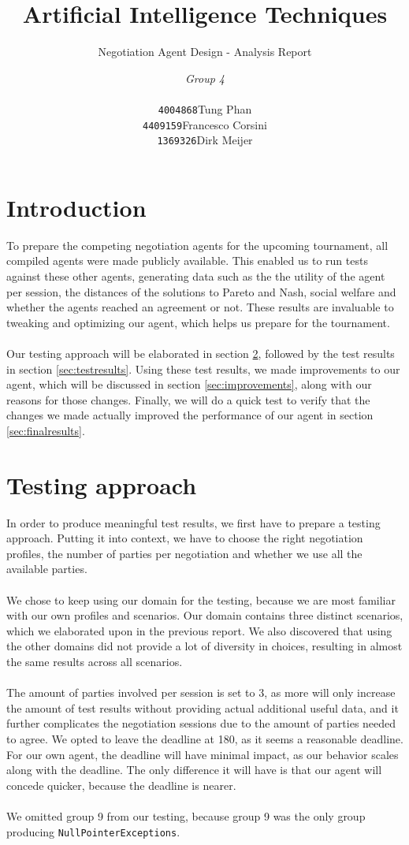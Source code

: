 \documentclass[a4,11pt]{scrartcl}
\title{Artificial Intelligence Techniques}
\subtitle{Negotiation Agent Design - Analysis Report}
\author{\emph{Group 4}\\
\begin{tabular}{ll}
\texttt{4004868}&Tung Phan\\
\texttt{4409159}&Francesco Corsini\\
\texttt{1369326}&Dirk Meijer
\end{tabular}}
\begin{document}
\maketitle

\null\vfill
\tableofcontents
\pagebreak

\section{Introduction}
To prepare the competing negotiation agents for the upcoming tournament, all compiled agents were made publicly available. This enabled us to run tests against these other agents, generating data such as the the utility of the agent per session, the distances of the solutions to Pareto and Nash, social welfare and whether the agents reached an agreement or not. These results are invaluable to tweaking and optimizing our agent, which helps us prepare for the tournament.
\\ \\
Our testing approach will be elaborated in section \ref{sec:testingapproach}, followed by the test results in section \ref{sec:testresults}. Using these test results, we made improvements to our agent, which will be discussed in section \ref{sec:improvements}, along with our reasons for those changes. Finally, we will do a quick test to verify that the changes we made actually improved the performance of our agent in section \ref{sec:finalresults}.
    
\section{Testing approach}
\label{sec:testingapproach}
In order to produce meaningful test results, we first have to prepare a testing approach. Putting it into context, we have to choose the right negotiation profiles, the number of parties per negotiation and whether we use all the available parties.
\\ \\
We chose to keep using our domain for the testing, because we are most familiar with our own profiles and scenarios. Our domain contains three distinct scenarios, which we elaborated upon in the previous report. We also discovered that using the other domains did not provide a lot of diversity in choices, resulting in almost the same results across all scenarios. 
\\ \\
The amount of parties involved per session is set to 3, as more will only increase the amount of test results without providing actual additional useful data, and it further complicates the negotiation sessions due to the amount of parties needed to agree.
We opted to leave the deadline at 180, as it seems a reasonable deadline. For our own agent, the deadline will have minimal impact, as our behavior scales along with the deadline. The only difference it will have is that our agent will concede quicker, because the deadline is nearer.
\\ \\
We omitted group 9 from our testing, because group 9 was the only group producing \verb|NullPointerExceptions|.
\end{document}

